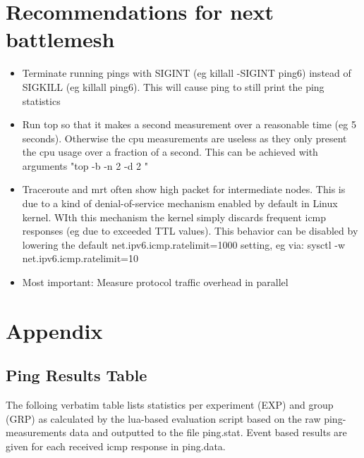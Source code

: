 \documentclass[a4paper,12pt,twoside]{article}
\begin{document}
\section{Recommendations for next battlemesh}

\begin{itemize}

\item Terminate running pings with SIGINT (eg killall -SIGINT ping6) instead of SIGKILL (eg killall ping6). This will cause ping to still print the ping statistics

\item Run top so that it makes a second measurement over a reasonable time (eg 5 seconds). Otherwise the cpu measurements are useless as they only present the cpu usage over a fraction of a second. This can be achieved with arguments "top -b -n 2 -d 2 "

\item Traceroute and mrt often show  high packet for intermediate nodes. This is due to a kind of denial-of-service mechanism enabled by default in Linux kernel. WIth this mechanism the kernel simply discards frequent icmp responses (eg due to exceeded TTL values). This behavior can be disabled by lowering the default net.ipv6.icmp.ratelimit=1000 setting, eg via: sysctl -w net.ipv6.icmp.ratelimit=10

\item Most important: Measure protocol traffic overhead in parallel
\end{itemize}


\section{Appendix}

\subsection{Ping Results Table}

The folloing verbatim table lists statistics per experiment (EXP) and group (GRP) as calculated by the lua-based
evaluation script based on the raw ping-measurements data and outputted to the file ping.stat.
Event based results are given for each received icmp response in ping.data.
\end{document}
